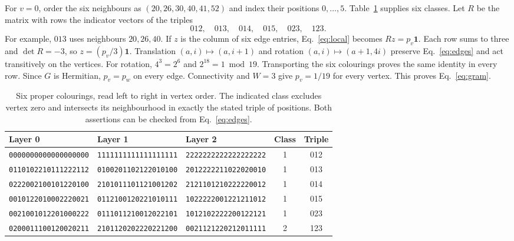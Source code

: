 \documentclass[11pt]{article}
\newcommand{\one}{\mathbf 1}
\begin{document}
For $v=0$, order the six neighbours as $(20,26,30,40,41,52)$ and index their positions $0,\ldots,5$. Table~\ref{tab:color} supplies six classes. Let $R$ be the matrix with rows the indicator vectors of the triples
\[
           012,\quad013,\quad014,\quad015,\quad023,\quad123.
\]
For example, $013$ uses neighbours $20,26,40$. If $z$ is the column of six edge entries, Eq.~\eqref{eq:local} becomes $Rz=p_v\one$. Each row sums to three and $\det R=-3$, so $z=(p_v/3)\one$. Translation $(a,i)\mapsto(a,i+1)$ and rotation $(a,i)\mapsto(a+1,4i)$ preserve Eq.~\eqref{eq:edges} and act transitively on the vertices. For rotation, $4^3=2^6$ and $2^{18}=1\bmod19$. Transporting the six colourings proves the same identity in every row. Since $G$ is Hermitian, $p_v=p_w$ on every edge. Connectivity and $W=3$ give $p_v=1/19$ for every vertex. This proves Eq.~\eqref{eq:gram}.

\begin{table}[ht]
\centering\small
\setlength{\tabcolsep}{4pt}
\begin{tabular}{@{}lllcc@{}}
\toprule
Layer 0 & Layer 1 & Layer 2 & Class & Triple\\\midrule
\texttt{0000000000000000000} & \texttt{1111111111111111111} & \texttt{2222222222222222222} & 1 & 012 \\
\texttt{0110102210111222112} & \texttt{0100201102122010100} & \texttt{2012222211022020010} & 1 & 013 \\
\texttt{0222002100101220100} & \texttt{2101011101121001202} & \texttt{2121101210222220012} & 1 & 014 \\
\texttt{0010122010002220021} & \texttt{0112100120221010111} & \texttt{1022222001221211012} & 1 & 015 \\
\texttt{0021001012201000222} & \texttt{0111011210012022101} & \texttt{1012102222200122121} & 1 & 023 \\
\texttt{0200011100120020211} & \texttt{2101120202220221200} & \texttt{0021121220212011111} & 2 & 123 \\
\bottomrule
\end{tabular}
\caption{Six proper colourings, read left to right in vertex order. The indicated class excludes vertex zero and intersects its neighbourhood in exactly the stated triple of positions. Both assertions can be checked from Eq.~\eqref{eq:edges}.}
\label{tab:color}
\end{table}
\end{document}
